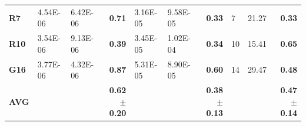 \documentclass[encoding=utf8,british]{tumphthesis}
\begin{document}
\begin{table}[H]
\begin{subtable}{1\textwidth}
{\begin{tabular}{|l|llr|llr|llr|}
\rowcolor[HTML]{CFE2F3} 
\textbf{R7}                               & 4.54E-06                                             & 6.42E-06                                              & \textbf{0.71}                                    & 3.16E-05                                            & 9.58E-05                                              & \textbf{0.33}                                    & 7                                                    & 21.27                                                 & \textbf{0.33}                                    \\
\textbf{R10}                              & 3.54E-06                                             & 9.13E-06                                              & \textbf{0.39}                                    & 3.45E-05                                             & 1.02E-04                                              & \textbf{0.34}                                    & 10                                                   & 15.41                                                 & \textbf{0.65}                                    \\
\rowcolor[HTML]{CFE2F3} 
\textbf{G16}                              & 3.77E-06                                             & 4.32E-06                                              & \textbf{0.87}                                    & 5.31E-05                                             & 8.90E-05                                              & \textbf{0.60}                                    & 14                                                   & 29.47                                                 & \textbf{0.48}                                    \\ \hline
\textbf{AVG}                             &                                                      &                                                       & \textbf{0.62$\pm$0.20}                           &                                                      &                                                       & \textbf{0.38$\pm$0.13}                           &                                                      &                                                       & \textbf{0.47$\pm$0.14}                          \\ \hline
\end{tabular}}
\end{subtable}

\bigskip
\begin{subtable}{1\textwidth}
\label{tab:benchmark-radmon-cpCSSC}


\end{subtable}
\end{table}
\end{document}
